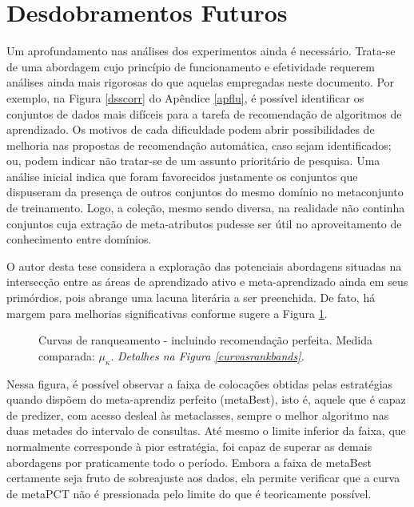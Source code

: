 \section{Desdobramentos Futuros}\label{futuro}
Um aprofundamento nas análises dos experimentos ainda é necessário.
Trata-se de uma abordagem cujo princípio de funcionamento e efetividade requerem análises ainda mais rigorosas do que aquelas empregadas neste documento.
Por exemplo, na Figura \ref{dsscorr} do Apêndice \ref{apflu}, é possível identificar os conjuntos de dados mais difíceis para a tarefa de recomendação de algoritmos de aprendizado.
Os motivos de cada dificuldade podem abrir possibilidades de melhoria nas propostas de recomendação automática, caso sejam identificados; ou, podem indicar não tratar-se de um assunto prioritário de pesquisa.
Uma análise inicial indica que foram favorecidos justamente os conjuntos que dispuseram da presença de outros conjuntos do mesmo domínio no metaconjunto de treinamento.
Logo, a coleção, mesmo sendo diversa, na realidade não continha conjuntos cuja extração de meta-atributos pudesse ser útil no aproveitamento de conhecimento entre domínios.


O autor desta tese considera a exploração das potenciais abordagens situadas na intersecção entre as áreas de aprendizado ativo e meta-aprendizado ainda em seus primórdios, pois abrange uma lacuna literária a ser preenchida.
De fato, há margem para melhorias significativas conforme sugere a Figura \ref{curvasrankbandsmetabest}.
\begin{figure}[]
\centering
	
	\caption[Curvas de ranqueamento com meta-aprendiz e recomendação perfeita.]{Curvas de ranqueamento - incluindo recomendação perfeita. Medida comparada: $\mu_{\kappa}$. \textit{Detalhes na Figura \ref{curvasrankbands}.}}
	\label{curvasrankbandsmetabest}
\end{figure}
Nessa figura, é possível observar a faixa de colocações obtidas pelas estratégias quando dispõem do meta-aprendiz perfeito (metaBest), isto é, aquele que é capaz de predizer, com acesso desleal às metaclasses, sempre o melhor algoritmo nas duas metades do intervalo de consultas.
Até mesmo o limite inferior da faixa, que normalmente corresponde à pior estratégia, foi capaz de superar as demais abordagens por praticamente todo o período.
Embora a faixa de metaBest certamente seja fruto de sobreajuste aos dados, ela permite verificar que a curva de metaPCT não é pressionada pelo limite do que é teoricamente possível.

